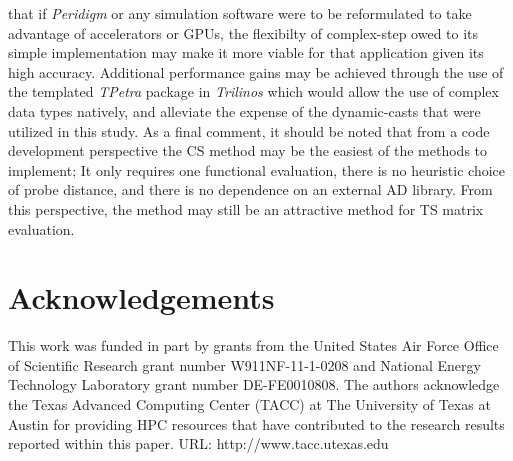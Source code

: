 \documentclass[preprint,12pt]{elsarticle}
\begin{document}
that if \emph{Peridigm} or any simulation software were to be reformulated to
take advantage of accelerators or GPUs, the flexibilty of complex-step owed to
its simple implementation may make it more viable for that application given
its high accuracy. Additional performance gains may be achieved through the use
of the templated \emph{TPetra} package in \emph{Trilinos} which would allow the
use of complex data types natively, and alleviate the expense of the
dynamic-casts that were utilized in this study.  As a final comment, it should
be noted that from a code development perspective the CS method may be the
easiest of the methods to implement; It only requires one functional
evaluation, there is no heuristic choice of probe distance, and there is no
dependence on an external AD library.  From this perspective, the method may
still be an attractive method for TS matrix evaluation.  


\section{Acknowledgements}
\label{sec:ack}
This work was funded in part by grants from the United States Air Force Office of Scientific Research grant number W911NF-11-1-0208 and National Energy Technology Laboratory grant number DE-FE0010808. The authors acknowledge the Texas Advanced Computing Center (TACC) at The University of Texas at Austin for providing HPC resources that have contributed to the research results reported within this paper. URL: http://www.tacc.utexas.edu





\appendix
\renewcommand*{\thesection}{\Alph{section}}
%
\end{document}
